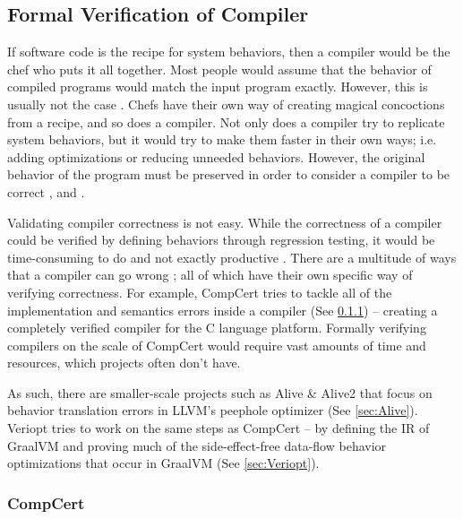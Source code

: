 \subsection{Formal Verification of Compiler}

If software code is the recipe for system behaviors, then a compiler would be the chef who puts it all together. Most people would assume that 
the behavior of compiled programs would match the input program exactly. However, this is usually not the case \cite{compcertVerification}. 
Chefs have their own way of creating magical concoctions from a recipe, and so does a compiler. Not only does a compiler try to replicate 
system behaviors, but it would try to make them faster in their own ways; i.e. adding optimizations or reducing unneeded behaviors. However, the 
original behavior of the program must be preserved in order to consider a compiler to be correct 
\cite{compcertVerification,AliveInLean,Alive2}, and \cite{Term_Graph_Optimizations}.

Validating compiler correctness is not easy. While the correctness of a compiler could be verified by defining behaviors through regression testing, 
it would be time-consuming to do and not exactly productive \cite{randomTesting,compcertVerification}. There are a multitude of ways that a 
compiler can go wrong \cite[Sec. 1.2]{CompilerOptimization}; all of which have their own specific way of verifying correctness. For example, 
CompCert \cite{compcertVerification} tries to tackle all of the implementation and semantics errors inside a compiler (See \ref{sec:CompCert}) -- 
creating a completely verified compiler for the C language platform. Formally verifying compilers on the scale of CompCert would require vast amounts 
of time and resources, which projects often don't have.

As such, there are smaller-scale projects such as Alive \cite{AliveInLean} \& Alive2 \cite{Alive2} that focus on behavior translation errors 
in LLVM's peephole optimizer (See \ref{sec:Alive}). Veriopt tries to work on the same steps as CompCert -- by defining the IR of GraalVM and 
proving much of the side-effect-free data-flow behavior optimizations that occur in GraalVM 
\cite{ATVA21_GraalVM_IR_Semantics,Term_Graph_Optimizations} (See \ref{sec:Veriopt}).

\subsubsection{CompCert}
\label{sec:CompCert}

